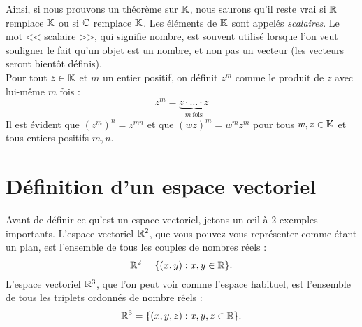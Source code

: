 \documentclass[12pt]{book}
\theoremstyle{plain}
\begin{document}
Ainsi, si nous prouvons un théorème sur $\mathbb{K}$, nous saurons qu'il reste vrai si $\mathbb{R}$ remplace $\mathbb{K}$ ou si $\mathbb{C}$ remplace $\mathbb{K}$. Les éléments de $\mathbb{K}$ sont appelés \textit{scalaires}. Le mot << scalaire >>, qui signifie nombre, est souvent utilisé lorsque l'on veut souligner le fait qu'un objet est un nombre, et non pas un vecteur (les vecteurs seront bientôt définis).\\
\indent{}Pour tout $z\in\mathbb{K}$ et $m$ un entier positif, on définit $z^m$ comme le produit de $z$ avec lui-même $m$ fois :
\begin{equation*}
    z^m = \underbrace{z\cdot \ldots \cdot z}_{m~\mathrm{fois}}
\end{equation*}
Il est évident que $(z^m)^n=z^{mn}$ et que $(wz)^m=w^mz^m$ pour tous $w,z\in\mathbb{K}$ et tous entiers positifs $m,n$.

\pagebreak
\newpage

\section*{Définition d'un espace vectoriel}

Avant de définir ce qu'est un espace vectoriel, jetons un œil à 2 exemples importants. L'espace vectoriel $\mathbb{R}^2$, que vous pouvez vous représenter comme étant un plan, est l'ensemble de tous les couples de nombres réels :
\begin{equation*}
    \mathbb{R}^2=\{(x,y):x,y\in\mathbb{R}\}\mathrm{.}
\end{equation*}
L'espace vectoriel $\mathbb{R}^3$, que l'on peut voir comme l'espace habituel, est l'ensemble de tous les triplets ordonnés de nombre réels :
\begin{equation*}
    \mathbb{R}^3=\{(x,y,z):x,y,z\in\mathbb{R}\}\mathrm{.}
\end{equation*}
\end{document}

